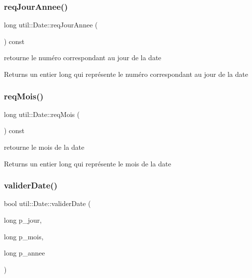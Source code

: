 \subsubsection{\texorpdfstring{req\+Jour\+Annee()}{reqJourAnnee()}}
{\footnotesize\ttfamily long util\+::\+Date\+::req\+Jour\+Annee (\begin{DoxyParamCaption}{ }\end{DoxyParamCaption}) const}



retourne le numéro correspondant au jour de la date 

\begin{DoxyReturn}{Returns}
un entier long qui représente le numéro correspondant au jour de la date 
\end{DoxyReturn}
\mbox{\label{classutil_1_1Date_a8002c391b812945da68b16cb4a424460}} 
\subsubsection{\texorpdfstring{req\+Mois()}{reqMois()}}
{\footnotesize\ttfamily long util\+::\+Date\+::req\+Mois (\begin{DoxyParamCaption}{ }\end{DoxyParamCaption}) const}



retourne le mois de la date 

\begin{DoxyReturn}{Returns}
un entier long qui représente le mois de la date 
\end{DoxyReturn}
\mbox{\label{classutil_1_1Date_af4b4dde01395754245a42483358cb538}} 
\subsubsection{\texorpdfstring{valider\+Date()}{validerDate()}}
{\footnotesize\ttfamily bool util\+::\+Date\+::valider\+Date (\begin{DoxyParamCaption}\item[{long}]{p\+\_\+jour,  }\item[{long}]{p\+\_\+mois,  }\item[{long}]{p\+\_\+annee }\end{DoxyParamCaption})\hspace{0.3cm}{\ttfamily [static]}}




